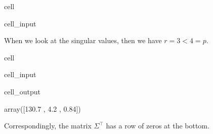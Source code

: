 \documentclass[letterpaper,10pt,english]{jupyterBook}
\begin{document}
\begin{sphinxuseclass}{cell}\begin{sphinxVerbatimInput}

\begin{sphinxuseclass}{cell_input}
\begin{sphinxVerbatim}[commandchars=\\\{\}]
  \PYG{p}{[}\PYG{p}{]}
  \PYG{p}{[}\PYG{p}{]}
 
     \PYG{p}{[}\PYG{p}{]}  
   
\end{sphinxVerbatim}

\end{sphinxuseclass}\end{sphinxVerbatimInput}

\end{sphinxuseclass}
\sphinxAtStartPar
When we look at the singular values, then we have \(r=3<4=p\).

\begin{sphinxuseclass}{cell}\begin{sphinxVerbatimInput}

\begin{sphinxuseclass}{cell_input}
\begin{sphinxVerbatim}[commandchars=\\\{\}]
\end{sphinxVerbatim}

\end{sphinxuseclass}\end{sphinxVerbatimInput}
\begin{sphinxVerbatimOutput}

\begin{sphinxuseclass}{cell_output}
\begin{sphinxVerbatim}[commandchars=\\\{\}]
array([130.7 ,   4.2 ,   0.84])
\end{sphinxVerbatim}

\end{sphinxuseclass}\end{sphinxVerbatimOutput}

\end{sphinxuseclass}
\sphinxAtStartPar
Correspondingly, the matrix \(\Sigma^\top\) has a row of zeros at the bottom.
\end{document}

